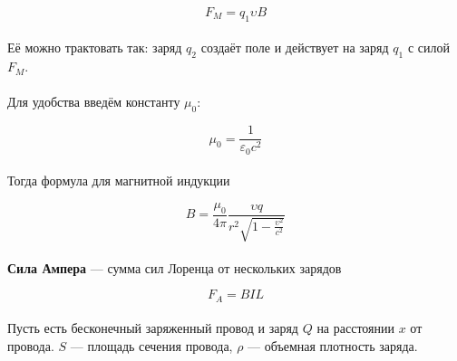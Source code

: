 \documentclass[dvipdfmx]{article}
\begin{document}
\begin{equation*}
  F_M = q_1\upsilon B
\end{equation*}
\paragraph{}

Её можно трактовать так: заряд $q_2$ создаёт поле и действует на заряд $q_1$ с силой $F_M$.

\paragraph{}

Для удобства введём константу $\mu_0$:

\begin{equation*}
  \mu_0 = \frac{1}{\varepsilon_0c^2}
\end{equation*}
\paragraph{}

Тогда формула для магнитной индукции

\begin{equation*}
  B = \frac{\mu_0}{4\pi}\frac{\upsilon q}{r^2\sqrt{1-\frac{\upsilon^2}{c^2}}}
\end{equation*}
\paragraph{}

\textbf{Сила Ампера} --- сумма сил Лоренца от нескольких зарядов

\begin{equation*}
  F_A = BIL
\end{equation*}

\newpage

\paragraph{}
Пусть есть бесконечный заряженный провод и заряд $Q$ на расстоянии $x$ от провода. $S$ --- площадь
сечения провода, $\rho$ --- объемная плотность заряда.
\end{document}

